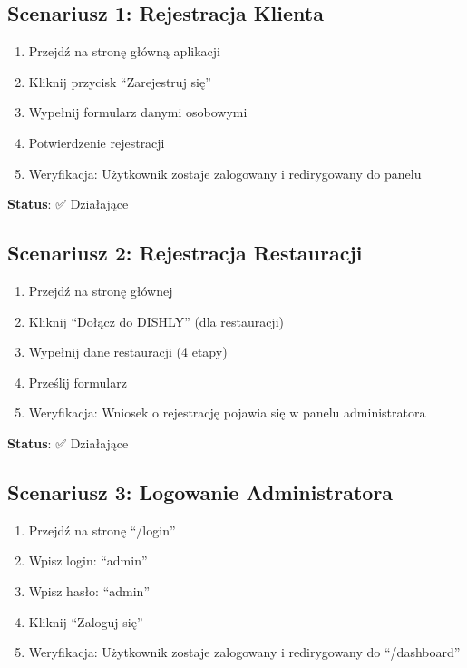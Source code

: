 ﻿\documentclass[12pt,a4paper,utf-8]{article}
\begin{document}
\newpage

\subsection{Scenariusz 1: Rejestracja Klienta}

\begin{enumerate}
    \item Przejdź na stronę główną aplikacji
    \item Kliknij przycisk ``Zarejestruj się''
    \item Wypełnij formularz danymi osobowymi
    \item Potwierdzenie rejestracji
    \item Weryfikacja: Użytkownik zostaje zalogowany i redirygowany do panelu
\end{enumerate}

\textbf{Status}: ✅ Działające

\subsection{Scenariusz 2: Rejestracja Restauracji}

\begin{enumerate}
    \item Przejdź na stronę głównej
    \item Kliknij ``Dołącz do DISHLY'' (dla restauracji)
    \item Wypełnij dane restauracji (4 etapy)
    \item Prześlij formularz
    \item Weryfikacja: Wniosek o rejestrację pojawia się w panelu administratora
\end{enumerate}

\textbf{Status}: ✅ Działające

\subsection{Scenariusz 3: Logowanie Administratora}

\begin{enumerate}
    \item Przejdź na stronę ``/login''
    \item Wpisz login: ``admin''
    \item Wpisz hasło: ``admin''
    \item Kliknij ``Zaloguj się''
    \item Weryfikacja: Użytkownik zostaje zalogowany i redirygowany do ``/dashboard''
\end{enumerate}
\end{document}
